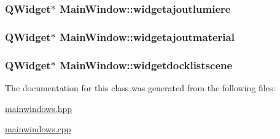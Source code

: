 \hypertarget{class_main_window_a9e2c8a96b09dbbfaa041531420603b9e}{
\subsubsection[{widgetajoutlumiere}]{\setlength{\rightskip}{0pt plus 5cm}Q\+Widget$\ast$ Main\+Window\+::widgetajoutlumiere\hspace{0.3cm}{\ttfamily [private]}}}\label{class_main_window_a9e2c8a96b09dbbfaa041531420603b9e}
\hypertarget{class_main_window_a071e7995e629a7b42ddbc5f54eae7dd3}{
\subsubsection[{widgetajoutmaterial}]{\setlength{\rightskip}{0pt plus 5cm}Q\+Widget$\ast$ Main\+Window\+::widgetajoutmaterial\hspace{0.3cm}{\ttfamily [private]}}}\label{class_main_window_a071e7995e629a7b42ddbc5f54eae7dd3}
\hypertarget{class_main_window_a38d553a96a3898e65b500c639673b8de}{
\subsubsection[{widgetdocklistscene}]{\setlength{\rightskip}{0pt plus 5cm}Q\+Widget$\ast$ Main\+Window\+::widgetdocklistscene\hspace{0.3cm}{\ttfamily [private]}}}\label{class_main_window_a38d553a96a3898e65b500c639673b8de}


The documentation for this class was generated from the following files\+:\begin{DoxyCompactItemize}
\item 
\hyperlink{mainwindows_8hpp}{mainwindows.\+hpp}\item 
\hyperlink{mainwindows_8cpp}{mainwindows.\+cpp}\end{DoxyCompactItemize}
